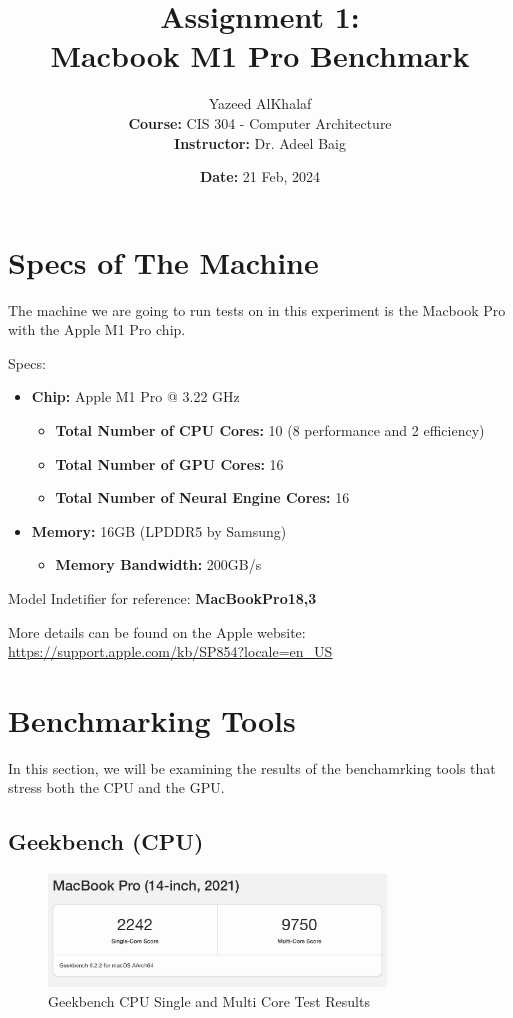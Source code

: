 \documentclass[a4paper]{article}
\title{\textbf{Assignment 1:\\Macbook M1 Pro Benchmark}}
\author{
    Yazeed AlKhalaf\\
    \textbf{Course:} CIS 304 - Computer Architecture\\
    \textbf{Instructor:} Dr. Adeel Baig
}
\date{\textbf{Date:} 21 Feb, 2024}
\begin{document}
\maketitle

\newpage

\section{Specs of The Machine}

The machine we are going to run tests on in this experiment is the Macbook Pro with the Apple M1 Pro chip.

Specs:
\begin{itemize}
    \item \textbf{Chip:} Apple M1 Pro @ 3.22 GHz
    \begin{itemize}
        \item \textbf{Total Number of CPU Cores:} 10 (8 performance and 2 efficiency)
        \item \textbf{Total Number of GPU Cores:} 16
        \item \textbf{Total Number of Neural Engine Cores:} 16
    \end{itemize}
    \item \textbf{Memory:} 16GB (LPDDR5 by Samsung)
    \begin{itemize}
        \item \textbf{Memory Bandwidth:} 200GB/s
    \end{itemize}
\end{itemize}

Model Indetifier for reference: \textbf{MacBookPro18,3}

More details can be found on the Apple website: \url{https://support.apple.com/kb/SP854?locale=en_US}

\section{Benchmarking Tools}

In this section, we will be examining the results of the benchamrking tools that stress both the CPU and the GPU.

\subsection{Geekbench (CPU)}

\begin{figure}[h!]
    \centering
    \includegraphics[width=0.8\textwidth]{images/geekbench-single-multi-core.png}
    \caption{Geekbench CPU Single and Multi Core Test Results}
    \label{fig:geekbench-single-multi-core}
\end{figure}
\end{document}
